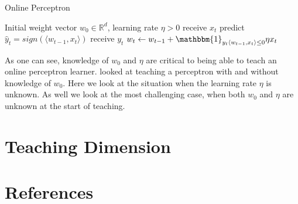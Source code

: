 \documentclass{article}
\begin{document}
\begin{algorithm}
\caption{Online Perceptron}
\begin{algorithmic}[1]
	\REQUIRE Initial weight vector $w_0 \in \mathbb{R}^d$, learning rate $\eta > 0$
    	\STATE receive $x_t$
    	\STATE predict $\hat{y}_t = sign(\langle w_{t-1} , x_t \rangle)$
    	\STATE receive $y_t$
    	\STATE $w_t \leftarrow w_{t-1} + \mathbbm{1}_{y_t \langle w_{t-1} , x_t \rangle \leq 0} \eta x_t$
    \ENDFOR
\end{algorithmic}
\end{algorithm}

As one can see, knowledge of $w_0$ and $\eta$ are critical to being able to teach an online perceptron learner. \cite{perceptron} looked at teaching a perceptron with and without knowledge of $w_0$. Here we look at the situation when the learning rate $\eta$ is unknown. As well we look at the most challenging case, when both $w_0$ and $\eta$ are unknown at the start of teaching. 


\section{Teaching Dimension}




\section*{References}



\small


\end{document}
